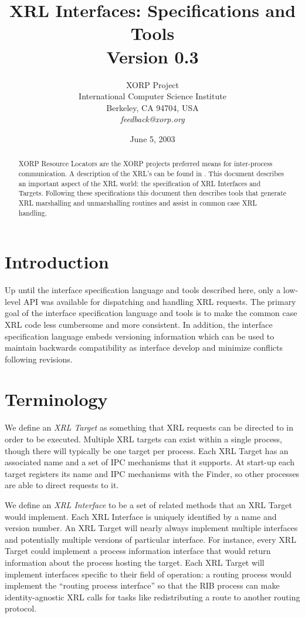 \documentclass[11pt]{article}
\title{
XRL Interfaces: Specifications and Tools \\
\vspace{1ex} Version 0.3
}
\author{ XORP Project					\\
	 International Computer Science Institute	\\
	 Berkeley, CA 94704, USA			\\
	 {\it feedback@xorp.org}
}
\date{June 5, 2003}
\begin{document}
\maketitle

\begin{abstract}
XORP Resource Locators are the XORP projects preferred means for
inter-process communication.  A description of the XRL's can be found
in \cite{xorp:xrl}.  This document describes an important aspect of the XRL
world: the specification of XRL Interfaces and Targets.  Following
these specifications this document then describes tools that generate
XRL marshalling and unmarshalling routines and assist in common case
XRL handling.
\end{abstract}

\section{Introduction}

Up until the interface specification language and tools described
here, only a low-level API was available for dispatching and handling
XRL requests.  The primary goal of the interface specification
language and tools is to make the common case XRL code less cumbersome
and more consistent.  In addition, the interface specification
language embeds versioning information which can be used to maintain
backwards compatibility as interface develop and minimize conflicts
following revisions.

\section{Terminology}

We define an \emph{XRL Target} as something that XRL requests can be
directed to in order to be executed.  Multiple XRL targets can
exist within a single process, though there will typically be one
target per process.  Each XRL Target has an associated name and a set
of IPC mechanisms that it supports.  At start-up each target registers
its name and IPC mechanisms with the Finder, so other processes are
able to direct requests to it.

We define an \emph{XRL Interface} to be a set of related methods that
an XRL Target would implement.  Each XRL Interface is uniquely
identified by a name and version number.  An XRL Target will nearly
always implement multiple interfaces and potentially multiple versions
of particular interface.  For instance, every XRL Target could
implement a process information interface that would return
information about the process hosting the target.  Each XRL Target
will implement interfaces specific to their field of operation: a
routing process would implement the ``routing process interface'' so
that the RIB process can make identity-agnostic XRL calls for tasks
like redistributing a route to another routing protocol.
\end{document}
